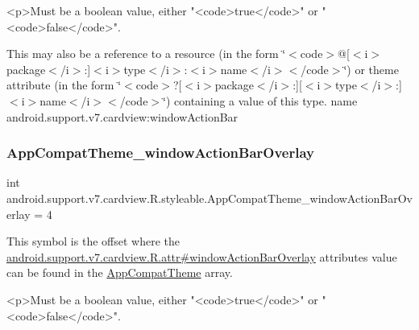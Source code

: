 \begin{DoxyVerb}      <p>Must be a boolean value, either "<code>true</code>" or "<code>false</code>".
\end{DoxyVerb}
 

This may also be a reference to a resource (in the form \char`\"{}$<$code$>$@\mbox{[}$<$i$>$package$<$/i$>$\+:\mbox{]}$<$i$>$type$<$/i$>$\+:$<$i$>$name$<$/i$>$$<$/code$>$\char`\"{}) or theme attribute (in the form \char`\"{}$<$code$>$?\mbox{[}$<$i$>$package$<$/i$>$\+:\mbox{]}\mbox{[}$<$i$>$type$<$/i$>$\+:\mbox{]}$<$i$>$name$<$/i$>$$<$/code$>$\char`\"{}) containing a value of this type.  name android.\+support.\+v7.\+cardview\+:window\+Action\+Bar \mbox{\label{classandroid_1_1support_1_1v7_1_1cardview_1_1R_1_1styleable_a283227c3d60e7ad20f595ff0f405c274}} 
\subsubsection{\texorpdfstring{App\+Compat\+Theme\+\_\+window\+Action\+Bar\+Overlay}{AppCompatTheme\_windowActionBarOverlay}}
{\footnotesize\ttfamily int android.\+support.\+v7.\+cardview.\+R.\+styleable.\+App\+Compat\+Theme\+\_\+window\+Action\+Bar\+Overlay = 4\hspace{0.3cm}{\ttfamily [static]}}

This symbol is the offset where the \hyperlink{classandroid_1_1support_1_1v7_1_1cardview_1_1R_1_1attr_ac53d0d65ea305899e1b811ba1d3151c9}{android.\+support.\+v7.\+cardview.\+R.\+attr\#window\+Action\+Bar\+Overlay} attribute\textquotesingle{}s value can be found in the \hyperlink{classandroid_1_1support_1_1v7_1_1cardview_1_1R_1_1styleable_a52e6f69f954ecc2622d72c0b4d298938}{App\+Compat\+Theme} array.

\begin{DoxyVerb}      <p>Must be a boolean value, either "<code>true</code>" or "<code>false</code>".
\end{DoxyVerb}
 

